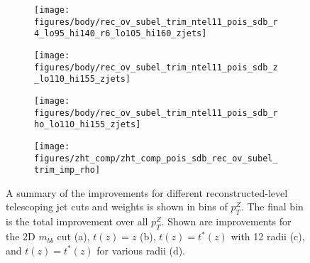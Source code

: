 \begin{figure}[!htbp]\captionsetup{justification=centering}
\begin{center}
\begin{subfigure}[t]{0.24\textwidth}\centering\texttt{[image: figures/body/rec\_ov\_subel\_trim\_ntel11\_pois\_sdb\_r4\_lo95\_hi140\_r6\_lo105\_hi160\_zjets]}\caption{}\end{subfigure}
\begin{subfigure}[t]{0.24\textwidth}\centering\texttt{[image: figures/body/rec\_ov\_subel\_trim\_ntel11\_pois\_sdb\_z\_lo110\_hi155\_zjets]}\caption{}\end{subfigure}
\begin{subfigure}[t]{0.24\textwidth}\centering\texttt{[image: figures/body/rec\_ov\_subel\_trim\_ntel11\_pois\_sdb\_rho\_lo110\_hi155\_zjets]}\caption{}\end{subfigure}
\begin{subfigure}[t]{0.24\textwidth}\centering\texttt{[image: figures/zht\_comp/zht\_comp\_pois\_sdb\_rec\_ov\_subel\_trim\_imp\_rho]}\caption{}\end{subfigure}
\caption{\label{fig:sigsumrec}A summary of the improvements for different reconstructed-level telescoping jet cuts and weights is shown in bins of $p_T^Z$.%
  The final bin is the total improvement over all $p_T^Z$.  Shown are improvements for the 2D $m_{bb}$ cut (a), $t\left(z\right)=z$ (b), $t\left(z\right)=t^*\left(z\right)$ with 12 radii (c), and $t\left(z\right)=t^*\left(z\right)$ for various radii (d).}
\end{center}
\end{figure}

